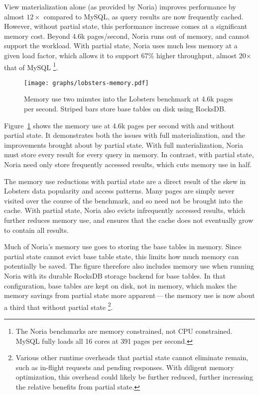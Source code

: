View materialization alone (as provided by Noria) improves performance by almost
$12\times$ compared to MySQL, as query results are now frequently cached.
However, without partial state, this performance increase comes at a significant
memory cost. Beyond 4.6k pages/second, Noria runs out of memory, and cannot
support the workload. With partial state, Noria uses much less memory at a given
load factor, which allows it to support 67\% higher throughput, almost
20$\times$ that of MySQL%
\footnote{The Noria benchmarks are memory constrained, not CPU constrained.
MySQL fully loads all 16 cores at 391 pages per second.}.

\begin{figure}[h]
  \centering
  \texttt{[image: graphs/lobsters-memory.pdf]}
  \caption{Memory use two minutes into the Lobsters benchmark at 4.6k pages per
  second. Striped bars store base tables on disk using RocksDB.}
  \label{f:lobsters-memory}
\end{figure}

Figure~\ref{f:lobsters-memory} shows the memory use at 4.6k pages per second
with and without partial state. It demonstrates both the issues with full
materialization, and the improvements brought about by partial state. With full
materialization, Noria must store every result for every query in memory. In
contrast, with partial state, Noria need only store frequently accessed results,
which cuts memory use in half.

The memory use reductions with partial state are a direct result of the skew in
Lobsters data popularity and access patterns. Many pages are simply never
visited over the course of the benchmark, and so need not be brought into the
cache. With partial state, Noria also evicts infrequently accessed results,
which further reduces memory use, and ensures that the cache does not eventually
grow to contain all results.

Much of Noria's memory use goes to storing the base tables in memory. Since
partial state cannot evict base table state, this limits how much memory can
potentially be saved. The figure therefore also includes memory use when running
Noria with its durable RocksDB storage backend for base tables. In that
configuration, base tables are kept on disk, not in memory, which makes the
memory savings from partial state more apparent\,---\,the memory use is now
about a third that without partial state%
\footnote{Various other runtime overheads that partial state cannot eliminate
remain, such as in-flight requests and pending responses. With diligent memory
optimization, this overhead could likely be further reduced, further increasing
the relative benefits from partial state.}.

